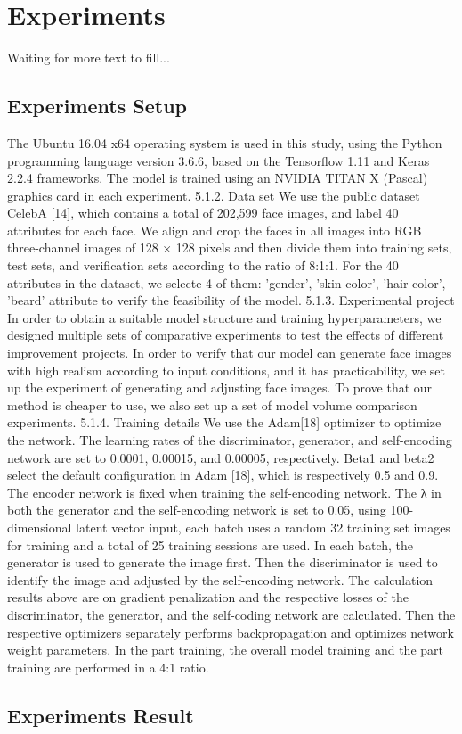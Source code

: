 \section{Experiments}

Waiting for more text to fill...
\subsection{Experiments Setup}
The Ubuntu 16.04 x64 operating system is used in this study, using the Python programming language version 3.6.6, based on the Tensorflow 1.11 and Keras 2.2.4 frameworks. The model is trained using an NVIDIA TITAN X (Pascal) graphics card in each experiment.
5.1.2. Data set
We use the public dataset CelebA [14], which contains a total of 202,599 face images, and label 40 attributes for each face. We align and crop the faces in all images into RGB three-channel images of 128 × 128 pixels and then divide them into training sets, test sets, and verification sets according to the ratio of 8:1:1. 
For the 40 attributes in the dataset, we selecte 4 of them: 'gender', 'skin color', 'hair color', 'beard' attribute to verify the feasibility of the model.
5.1.3. Experimental project
In order to obtain a suitable model structure and training hyperparameters, we designed multiple sets of comparative experiments to test the effects of different improvement projects.
In order to verify that our model can generate face images with high realism according to input conditions, and it has practicability, we set up the experiment of generating and adjusting face images.
To prove that our method is cheaper to use, we also set up a set of model volume comparison experiments.
5.1.4. Training details
We use the Adam[18] optimizer to optimize the network. The learning rates of the discriminator, generator, and self-encoding network are set to 0.0001, 0.00015, and 0.00005, respectively.
 Beta1 and beta2 select the default configuration in Adam [18], which is respectively 0.5 and 0.9. The encoder network is fixed when training the self-encoding network.
  The λ in both the generator and the self-encoding network is set to 0.05, using 100-dimensional latent vector input, each batch uses a random 32 training set images for training and a total of 25 training sessions are used. 
 In each batch, the generator is used to generate the image first. Then the discriminator is used to identify the image and adjusted by the self-encoding network.
 The calculation results above are on gradient penalization and the respective losses of the discriminator, the generator, and the self-coding network are calculated. Then the respective optimizers separately performs backpropagation and optimizes network weight parameters. In the part training, the overall model training and the part training are performed in a 4:1 ratio.
\subsection{Experiments Result}
